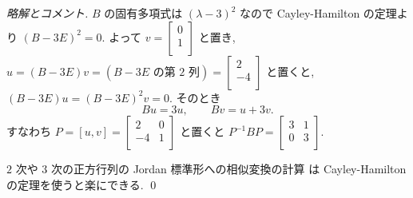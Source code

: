 \documentclass[12pt,twoside]{jarticle}
\newcommand\commentout[1]{#1}
\newcommand\commentout[1]{}
\begin{document}
\commentout{
\begin{proof}[略解とコメント]
$B$ の固有多項式は $(\lambda-3)^2$ なので 
Cayley-Hamilton の定理より $(B-3E)^2=0$.  
よって $v=
\begin{bmatrix}
  0 \\
  1 \\
\end{bmatrix}$ と置き, $u = (B-3E)v = (\text{$B-3E$ の第 $2$ 列}) = 
\begin{bmatrix}
  2 \\
  -4 \\
\end{bmatrix}$ と置くと, $(B-3E)u=(B-3E)^2v=0$. そのとき
\begin{equation*}
  Bu = 3u, \qquad Bv = u + 3v.
\end{equation*}
すなわち $P = [u,v] = 
\begin{bmatrix}
   2 & 0 \\
  -4 & 1 \\
\end{bmatrix}$ と置くと $P^{-1}BP=
\begin{bmatrix}
  3 & 1 \\
  0 & 3 \\
\end{bmatrix}$.

\medskip\noindent {\bf コメント.} 
$2$ 次や $3$ 次の正方行列の Jordan 標準形への相似変換の計算
は Cayley-Hamilton の定理を使うと楽にできる.
\qed
\end{proof}
}

\end{document}
